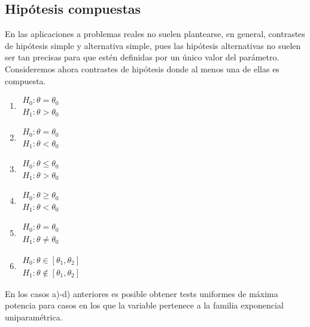 \subsection{Hipótesis compuestas}
\begin{tcolorbox}[colback=olive!5!white, colframe=olive!75!black, title=\textbf{Planteamiento}]
En las aplicaciones a problemas reales no suelen plantearse, en general, contrastes de hipótesis simple y alternativa simple, pues las hipótesis alternativas no suelen ser tan precisas para que estén definidas por un único valor del parámetro. Consideremos ahora contrastes de hipótesis donde al menos una de ellas es compuesta.
\end{tcolorbox}
\begin{tcolorbox}[colback=blue!5!white, colframe=blue!75!black, title=\textbf{Casos}]
\begin{center}
    \begin{varwidth}{0.5\textwidth}
    \begin{multicols}{2}
   \begin{enumerate}[label=\alph*)]
       \item $\begin{array}{l}
           H_0:\theta=\theta_0\\
           H_1:\theta>\theta_0
       \end{array}$
       \item $\begin{array}{l}
           H_0:\theta=\theta_0\\
           H_1:\theta<\theta_0
       \end{array}$
       \item $\begin{array}{l}
           H_0:\theta\le \theta_0\\
           H_1:\theta>\theta_0
       \end{array}$
       \item $\begin{array}{l}
           H_0:\theta\ge \theta_0\\
           H_1:\theta<\theta_0
       \end{array}$
       \item $\begin{array}{l}
           H_0:\theta=\theta_0\\
           H_1:\theta\neq \theta_0
       \end{array}$
       \item $\begin{array}{l}
               H_0:\theta\in [\theta_1,\theta_2]\\
               H_1:\theta\notin [\theta_1,\theta_2]
       \end{array}$
   \end{enumerate} 
\end{multicols}
\end{varwidth}
\end{center}
En los casos a)-d) anteriores es posible obtener tests uniformes de máxima potencia para casos en los que la variable pertenece a la familia exponencial uniparamétrica.
\end{tcolorbox}
